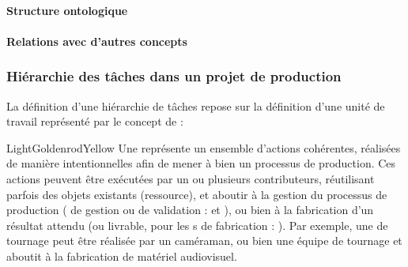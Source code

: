 \paragraph{Structure ontologique}
\paragraph{Relations avec d'autres concepts}

\subsubsection{Hiérarchie des tâches dans un projet de production}
La définition d'une hiérarchie de tâches repose sur la définition d'une unité de travail représenté par le concept de  : 

\begin{cadrecol}{LightGoldenrodYellow}
Une  représente un ensemble d'actions cohérentes, réalisées de manière intentionnelles afin de mener à bien un processus de production. 
Ces actions peuvent être exécutées par un ou plusieurs contributeurs, réutilisant parfois des objets existants (ressource), et aboutir à la gestion du processus de production ( de gestion ou de validation :  et ), ou bien à la fabrication d'un résultat attendu (ou livrable, pour les s de fabrication : ). 
Par exemple, une  de tournage peut être réalisée par un caméraman, ou bien une équipe de tournage et aboutit à la fabrication de matériel audiovisuel.
\end{cadrecol}

 

